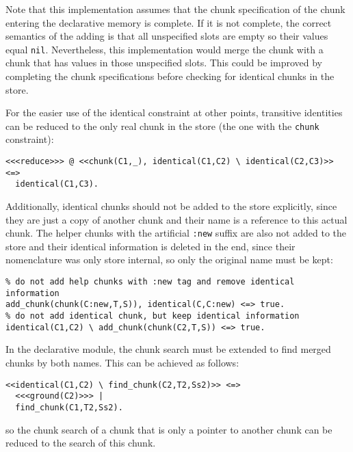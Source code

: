 Note that this implementation assumes that the chunk specification of the chunk entering the declarative memory is complete. If it is not complete, the correct semantics of the adding is that all unspecified slots are empty so their values equal \lstinline|nil|. Nevertheless, this implementation would merge the chunk with a chunk that has values in those unspecified slots. This could be improved by completing the chunk specifications before checking for identical chunks in the store.

For the easier use of the identical constraint at other points, transitive identities can be reduced to the only real chunk in the store (the one with the \lstinline|chunk| constraint):

\begin{lstlisting}
<<<reduce>>> @ <<chunk(C1,_), identical(C1,C2) \ identical(C2,C3)>> <=> 
  identical(C1,C3).
\end{lstlisting}

Additionally, identical chunks should not be added to the store explicitly, since they are just a copy of another chunk and their name is a reference to this actual chunk. The helper chunks with the artificial \lstinline|:new| suffix are also not added to the store and their identical information is deleted in the end, since their nomenclature was only store internal, so only the original name must be kept:

\begin{lstlisting}
% do not add help chunks with :new tag and remove identical information
add_chunk(chunk(C:new,T,S)), identical(C,C:new) <=> true. 
% do not add identical chunk, but keep identical information
identical(C1,C2) \ add_chunk(chunk(C2,T,S)) <=> true. 
\end{lstlisting}

In the declarative module, the chunk search must be extended to find merged chunks by both names. This can be achieved as follows:

\enlargethispage{-\baselineskip}

\begin{lstlisting}
<<identical(C1,C2) \ find_chunk(C2,T2,Ss2)>> <=> 
  <<<ground(C2)>>> | 
  find_chunk(C1,T2,Ss2).
\end{lstlisting}

so the chunk search of a chunk that is only a pointer to another chunk can be reduced to the search of this chunk. 

